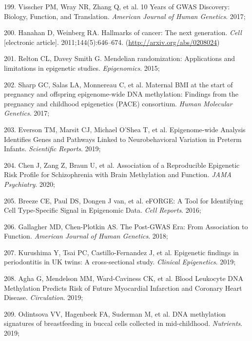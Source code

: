 \documentclass[11pt,twoside]{bristolthesis}
\newenvironment{cslreferences}%
  {}%
  {\par}
\begin{document}
\begin{cslreferences}
\leavevmode\hypertarget{ref-Visscher2017}{}%
199. Visscher PM, Wray NR, Zhang Q, et al. 10 Years of GWAS Discovery: Biology, Function, and Translation. \emph{American Journal of Human Genetics}. 2017;

\leavevmode\hypertarget{ref-Hanahan2011}{}%
200. Hanahan D, Weinberg RA. Hallmarks of cancer: The next generation. \emph{Cell} {[}electronic article{]}. 2011;144(5):646--674. (\url{http://arxiv.org/abs/0208024})

\leavevmode\hypertarget{ref-Relton2015}{}%
201. Relton CL, Davey Smith G. Mendelian randomization: Applications and limitations in epigenetic studies. \emph{Epigenomics}. 2015;

\leavevmode\hypertarget{ref-Sharp2017}{}%
202. Sharp GC, Salas LA, Monnereau C, et al. Maternal BMI at the start of pregnancy and offspring epigenome-wide DNA methylation: Findings from the pregnancy and childhood epigenetics (PACE) consortium. \emph{Human Molecular Genetics}. 2017;

\leavevmode\hypertarget{ref-Everson2019}{}%
203. Everson TM, Marsit CJ, Michael O'Shea T, et al. Epigenome-wide Analysis Identifies Genes and Pathways Linked to Neurobehavioral Variation in Preterm Infants. \emph{Scientific Reports}. 2019;

\leavevmode\hypertarget{ref-Chen2020}{}%
204. Chen J, Zang Z, Braun U, et al. Association of a Reproducible Epigenetic Risk Profile for Schizophrenia with Brain Methylation and Function. \emph{JAMA Psychiatry}. 2020;

\leavevmode\hypertarget{ref-Breeze2016}{}%
205. Breeze CE, Paul DS, Dongen J van, et al. eFORGE: A Tool for Identifying Cell Type-Specific Signal in Epigenomic Data. \emph{Cell Reports}. 2016;

\leavevmode\hypertarget{ref-Gallagher2018}{}%
206. Gallagher MD, Chen-Plotkin AS. The Post-GWAS Era: From Association to Function. \emph{American Journal of Human Genetics}. 2018;

\leavevmode\hypertarget{ref-Kurushima2019}{}%
207. Kurushima Y, Tsai PC, Castillo-Fernandez J, et al. Epigenetic findings in periodontitis in UK twins: A cross-sectional study. \emph{Clinical Epigenetics}. 2019;

\leavevmode\hypertarget{ref-Agha2019}{}%
208. Agha G, Mendelson MM, Ward-Caviness CK, et al. Blood Leukocyte DNA Methylation Predicts Risk of Future Myocardial Infarction and Coronary Heart Disease. \emph{Circulation}. 2019;

\leavevmode\hypertarget{ref-Odintsova2019}{}%
209. Odintsova VV, Hagenbeek FA, Suderman M, et al. DNA methylation signatures of breastfeeding in buccal cells collected in mid-childhood. \emph{Nutrients}. 2019;


\end{cslreferences}
\end{document}
